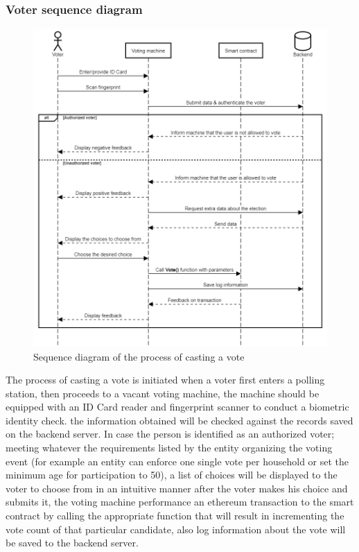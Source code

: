 \subsubsection{Voter sequence diagram}

\begin{figure}[H]
	\centering
		\includegraphics[width=14cm]{images/chapter3/voter_sequence_diagram.png}
		\caption{{\footnotesize Sequence diagram of the process of casting a vote}}
\end{figure}

The process of casting a vote is initiated when a voter first enters a polling station, then proceeds to a vacant voting machine, the machine should be equipped with an ID Card reader and fingerprint scanner to conduct a biometric identity check. the information obtained will be checked against the records saved on the backend server. In case the person is identified as an authorized voter; meeting whatever the requirements listed by the entity organizing the voting event (for example an entity can enforce one single vote per household or set the minimum age for participation to 50), a list of choices will be displayed to the voter to choose from in an intuitive manner after the voter makes his choice and submits it, the voting machine performance an ethereum transaction to the smart contract by calling the appropriate function that will result in incrementing the vote count of that particular candidate, also log information about the vote will be saved to the backend server.

